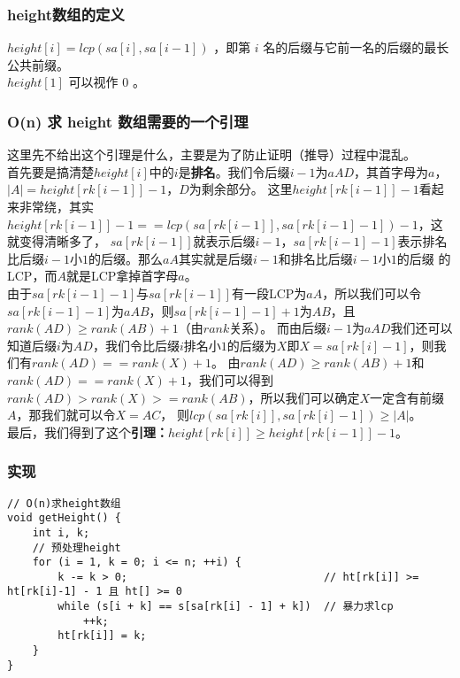         \subsubsection{height数组的定义}
            $height[i]=lcp(sa[i],sa[i-1])$ ，即第 $i$ 名的后缀与它前一名的后缀的最长公共前缀。\\
            $height[1]$ 可以视作 $0$ 。
        \subsubsection{O(n) 求 height 数组需要的一个引理}
            这里先不给出这个引理是什么，主要是为了防止证明（推导）过程中混乱。\\
            首先要是搞清楚$height[i]$中的$i$是\textbf{排名}。我们令后缀$i-1$为$aAD$，其首字母为$a$，$|A|=height[rk[i-1]]-1$，$D$为剩余部分。
            这里$height[rk[i-1]]-1$看起来非常绕，其实$height[rk[i-1]]-1==lcp(sa[rk[i-1]],sa[rk[i-1]-1])-1$，这就变得清晰多了，
            $sa[rk[i-1]]$就表示后缀$i-1$，$sa[rk[i-1]-1]$表示排名比后缀$i-1$小$1$的后缀。那么$aA$其实就是后缀$i-1$和排名比后缀$i-1$小$1$的后缀
            的LCP，而$A$就是LCP拿掉首字母$a$。\\
            由于$sa[rk[i-1]-1]$与$sa[rk[i-1]]$有一段LCP为$aA$，所以我们可以令$sa[rk[i-1]-1]$为$aAB$，则$sa[rk[i-1]-1]+1$为$AB$，且$rank(AD)\ge rank(AB)+1$（由$rank$关系）。
            而由后缀$i-1$为$aAD$我们还可以知道后缀$i$为$AD$，我们令比后缀$i$排名小$1$的后缀为$X$即$X=sa[rk[i]-1]$，则我们有$rank(AD)==rank(X)+1$。
            由$rank(AD)\ge rank(AB)+1$和$rank(AD)==rank(X)+1$，我们可以得到$rank(AD)>rank(X)>=rank(AB)$，所以我们可以确定$X$一定含有前缀$A$，那我们就可以令$X=AC$，
            则$lcp(sa[rk[i]],sa[rk[i]-1]) \ge |A|$。\\
            最后，我们得到了这个\textbf{引理：$height[rk[i]] \ge height[rk[i-1]]-1$}。
        \subsubsection{实现}
\begin{lstlisting}
// O(n)求height数组
void getHeight() {
    int i, k;
    // 预处理height
    for (i = 1, k = 0; i <= n; ++i) {
        k -= k > 0;                               // ht[rk[i]] >= ht[rk[i]-1] - 1 且 ht[] >= 0
        while (s[i + k] == s[sa[rk[i] - 1] + k])  // 暴力求lcp
            ++k;
        ht[rk[i]] = k;
    }
}
\end{lstlisting}
